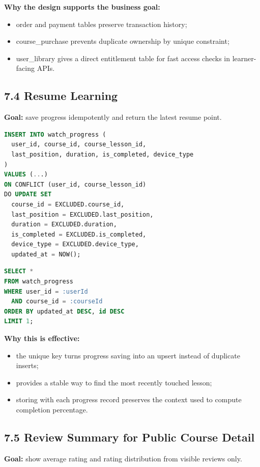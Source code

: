 \documentclass[11pt,a4paper]{article}
\newcommand{\code}[1]{\texttt{\detokenize{#1}}}
\begin{document}
\textbf{Why the design supports the business goal:}
\begin{itemize}[leftmargin=1.5em]
	\item order and payment tables preserve transaction history;
	\item course\_purchase prevents duplicate ownership by unique constraint;
	\item user\_library gives a direct entitlement table for fast access checks in learner-facing APIs.
\end{itemize}

\subsection*{7.4 Resume Learning}
\textbf{Goal:} save progress idempotently and return the latest resume point.

\begin{lstlisting}[style=sqlstyle,language=SQL]
INSERT INTO watch_progress (
  user_id, course_id, course_lesson_id,
  last_position, duration, is_completed, device_type
)
VALUES (...)
ON CONFLICT (user_id, course_lesson_id)
DO UPDATE SET
  course_id = EXCLUDED.course_id,
  last_position = EXCLUDED.last_position,
  duration = EXCLUDED.duration,
  is_completed = EXCLUDED.is_completed,
  device_type = EXCLUDED.device_type,
  updated_at = NOW();
\end{lstlisting}

\begin{lstlisting}[style=sqlstyle,language=SQL]
SELECT *
FROM watch_progress
WHERE user_id = :userId
  AND course_id = :courseId
ORDER BY updated_at DESC, id DESC
LIMIT 1;
\end{lstlisting}

\textbf{Why this is effective:}
\begin{itemize}[leftmargin=1.5em]
	\item the unique key turns progress saving into an upsert instead of duplicate inserts;
	\item \code{updatedAt} provides a stable way to find the most recently touched lesson;
	\item storing \code{duration} with each progress record preserves the context used to compute completion percentage.
\end{itemize}

\subsection*{7.5 Review Summary for Public Course Detail}
\textbf{Goal:} show average rating and rating distribution from visible reviews only.
\end{document}
